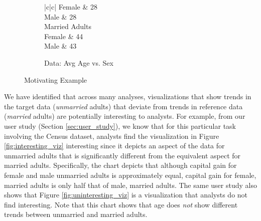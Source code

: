 \begin{example}
\begin{figure}[h]
\begin{subfigure}{0.49\linewidth}
\begin{tabular}{|c|c|}
	   	Female & 28 \\ \hline
	   	Male   &  28 \\ \hline
	   		{Married Adults} \\ \hline
		Female &  44 \\ \hline
		Male   &  43 \\ \hline
	  \end{tabular}
	  \caption{Data: Avg Age vs. Sex} \label{tab:uninteresting_viz}
	\end{subfigure}
	\vspace{-10pt}
	\caption{Motivating Example}
	\label{fig:intro}
	\vspace{-15pt}
\end{figure}

We have identified that across many analyses, 
visualizations that show trends in the target 
data ({\em unmarried} adults) that 
deviate from trends in reference data ({\em married}
adults) are potentially interesting to analysts.
For example, 
from our user study (Section \ref{sec:user_study}), 
we know that for this particular task involving the Census dataset,
analysts find the visualization in Figure \ref{fig:interesting_viz} 
interesting since it depicts an aspect of the data for unmarried adults 
that is significantly different from the equivalent aspect
for married adults.
Specifically, the chart depicts that although capital gain 
for female and male unmarried adults 
is approximately equal, capital gain for female, 
married adults is only half that of male, 
married adults.
The same user study also shows that Figure \ref{fig:uninteresting_viz} 
is a visualization that 
analysts do not find interesting. 
Note that this chart shows that age does {\em not} show different trends between unmarried
and married adults.
\end{example}

